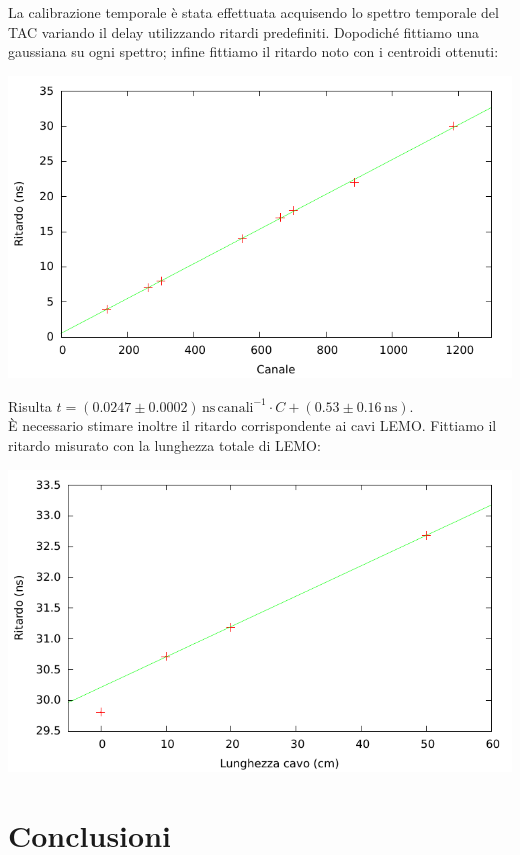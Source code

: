 \documentclass[10pt,a4paper]{article}
\begin{document}
La calibrazione temporale è stata effettuata acquisendo lo spettro temporale del TAC variando il delay utilizzando ritardi predefiniti. Dopodiché fittiamo una gaussiana su ogni spettro; infine fittiamo il ritardo noto con i centroidi ottenuti:

\includegraphics[scale=1]{../out/chio/Cal_DnDt}

Risulta $t = (0.0247 \pm 0.0002)\, \si{\nano\second}\,\mathrm{canali}^{-1} \cdot C + (0.53 \pm 0.16 \, \si{\nano\second})$.\\

\`E necessario stimare inoltre il ritardo corrispondente ai cavi LEMO. Fittiamo il ritardo misurato con la lunghezza totale di LEMO:

\includegraphics[scale=1]{../out/chio/tempo_residui}


\section{Conclusioni}
\end{document}
